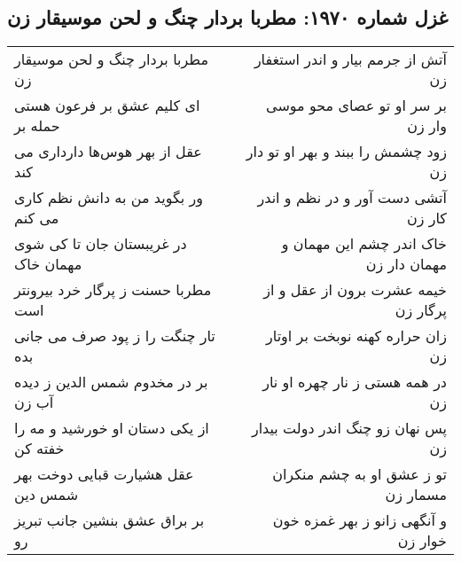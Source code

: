 \begin{center}
\section*{غزل شماره ۱۹۷۰: مطربا بردار چنگ و لحن موسیقار زن}
\label{sec:1970}
\begin{longtable}{l p{0.5cm} r}
مطربا بردار چنگ و لحن موسیقار زن
&&
آتش از جرمم بیار و اندر استغفار زن
\\
ای کلیم عشق بر فرعون هستی حمله بر
&&
بر سر او تو عصای محو موسی وار زن
\\
عقل از بهر هوس‌ها دارداری می کند
&&
زود چشمش را ببند و بهر او تو دار زن
\\
ور بگوید من به دانش نظم کاری می کنم
&&
آتشی دست آور و در نظم و اندر کار زن
\\
در غریبستان جان تا کی شوی مهمان خاک
&&
خاک اندر چشم این مهمان و مهمان دار زن
\\
مطربا حسنت ز پرگار خرد بیرونتر است
&&
خیمه عشرت برون از عقل و از پرگار زن
\\
تار چنگت را ز پود صرف می جانی بده
&&
زان حراره کهنه نوبخت بر اوتار زن
\\
بر در مخدوم شمس الدین ز دیده آب زن
&&
در همه هستی ز نار چهره او نار زن
\\
از یکی دستان او خورشید و مه را خفته کن
&&
پس نهان زو چنگ اندر دولت بیدار زن
\\
عقل هشیارت قبایی دوخت بهر شمس دین
&&
تو ز عشق او به چشم منکران مسمار زن
\\
بر براق عشق بنشین جانب تبریز رو
&&
و آنگهی زانو ز بهر غمزه خون خوار زن
\\
\end{longtable}
\end{center}
